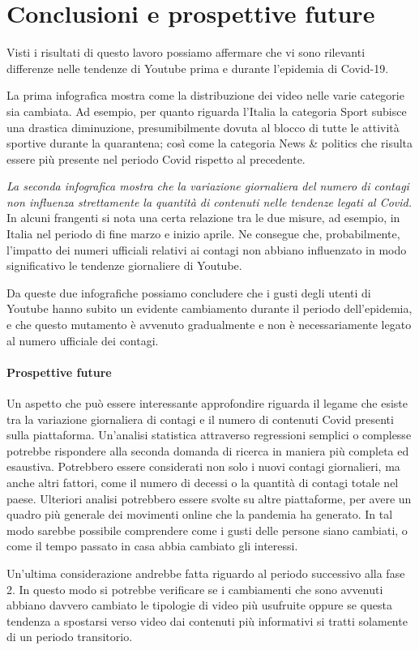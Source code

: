\documentclass[10pt, a4paper,openany]{article}
\begin{document}
\section*{Conclusioni e prospettive future}
Visti i risultati di questo lavoro possiamo affermare che vi sono rilevanti differenze nelle tendenze di Youtube prima e durante l'epidemia di Covid-19. 

La prima infografica mostra come la distribuzione dei video nelle varie categorie sia cambiata. Ad esempio, per quanto riguarda l'Italia la categoria Sport subisce una drastica diminuzione, presumibilmente dovuta al blocco di tutte le attività sportive durante la quarantena; così come la categoria News \& politics che risulta essere più presente nel periodo Covid rispetto al precedente.

\textit{La seconda infografica mostra che la variazione giornaliera del numero di contagi non influenza strettamente la quantità di contenuti nelle tendenze legati al Covid.} In alcuni frangenti si nota una certa relazione tra le due misure, ad esempio, in Italia nel periodo di fine marzo e inizio aprile. Ne consegue che, probabilmente, l'impatto dei numeri ufficiali relativi ai contagi non abbiano influenzato in modo significativo le tendenze giornaliere di Youtube.

Da queste due infografiche possiamo concludere che i gusti degli utenti di Youtube hanno subito un evidente cambiamento durante il periodo dell'epidemia, e che questo mutamento è avvenuto gradualmente e non è necessariamente legato al numero ufficiale dei contagi.

\paragraph{Prospettive future\\}

Un aspetto che può essere interessante approfondire riguarda il legame che esiste tra la variazione giornaliera di contagi e il numero di contenuti Covid presenti sulla piattaforma. Un'analisi statistica attraverso regressioni semplici o complesse potrebbe rispondere alla seconda domanda di ricerca in maniera più completa ed esaustiva. Potrebbero essere considerati non solo i nuovi contagi giornalieri, ma anche altri fattori, come il numero di decessi o la quantità di contagi totale nel paese.
Ulteriori analisi potrebbero essere svolte su altre piattaforme, per avere un quadro più generale dei movimenti online che la pandemia ha generato. In tal modo sarebbe possibile comprendere come i gusti delle persone siano cambiati, o come il tempo passato in casa abbia cambiato gli interessi.

Un'ultima considerazione andrebbe fatta riguardo al periodo successivo alla fase 2. In questo modo si potrebbe verificare se i cambiamenti che sono avvenuti abbiano davvero cambiato le tipologie di video più usufruite oppure se questa tendenza a spostarsi verso video dai contenuti più informativi si tratti solamente di un periodo transitorio.
\end{document}
